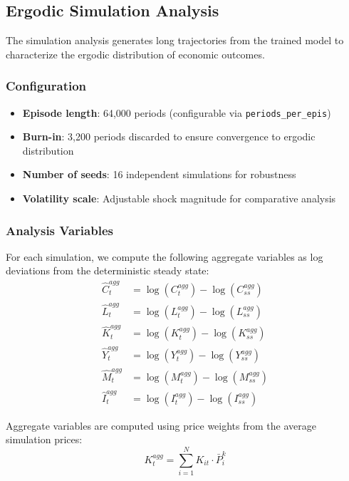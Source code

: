 \documentclass[11pt]{article}
\begin{document}
\subsection{Ergodic Simulation Analysis}

The simulation analysis generates long trajectories from the trained model to characterize the ergodic distribution of economic outcomes.

\subsubsection{Configuration}
\begin{itemize}
    \item \textbf{Episode length}: 64,000 periods (configurable via \texttt{periods\_per\_epis})
    \item \textbf{Burn-in}: 3,200 periods discarded to ensure convergence to ergodic distribution
    \item \textbf{Number of seeds}: 16 independent simulations for robustness
    \item \textbf{Volatility scale}: Adjustable shock magnitude for comparative analysis
\end{itemize}

\subsubsection{Analysis Variables}
For each simulation, we compute the following aggregate variables as log deviations from the deterministic steady state:
\begin{align}
    \hat{C}^{agg}_t &= \log(C^{agg}_t) - \log(C^{agg}_{ss}) \\
    \hat{L}^{agg}_t &= \log(L^{agg}_t) - \log(L^{agg}_{ss}) \\
    \hat{K}^{agg}_t &= \log(K^{agg}_t) - \log(K^{agg}_{ss}) \\
    \hat{Y}^{agg}_t &= \log(Y^{agg}_t) - \log(Y^{agg}_{ss}) \\
    \hat{M}^{agg}_t &= \log(M^{agg}_t) - \log(M^{agg}_{ss}) \\
    \hat{I}^{agg}_t &= \log(I^{agg}_t) - \log(I^{agg}_{ss})
\end{align}

Aggregate variables are computed using price weights from the average simulation prices:
\begin{equation}
    K^{agg}_t = \sum_{i=1}^N K_{it} \cdot \bar{P}^k_i
\end{equation}
\end{document}

